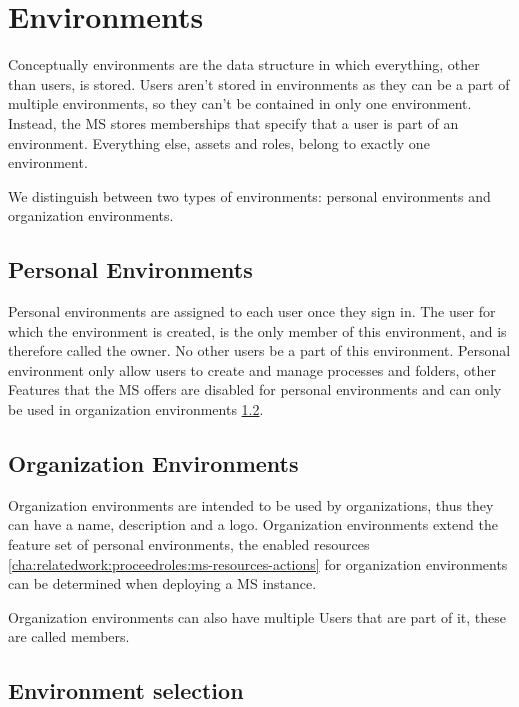 \section{Environments}
\label{cha:conceptanddesign:environments}

Conceptually environments are the data structure in which everything, other than users, is
stored.
Users aren't stored in environments as they can be a part of multiple environments, 
so they can't be contained in only one environment.
Instead, the MS stores memberships that specify that a user is part of an environment.
Everything else, assets and roles, belong to exactly one environment.

We distinguish between two types of environments: personal environments and organization
environments.

\subsection{Personal Environments}
\label{cha:conceptanddesign:environments:personal}

Personal environments are assigned to each user once they sign in. 
The user for which the environment is created, is the only member of this
environment, and is therefore called the owner.
No other users be a part of this environment.
Personal environment only allow users to create and manage processes and folders,
other Features that the MS offers are disabled for personal environments and can only be
used in organization environments \ref{cha:conceptanddesign:environments:organization}.

\subsection{Organization Environments}
\label{cha:conceptanddesign:environments:organization}

Organization environments are intended to be used by organizations, thus they can have a
name, description and a logo.
Organization environments extend the feature set of personal environments, the enabled
resources \ref{cha:relatedwork:proceedroles:ms-resources-actions} for organization
environments can be determined when deploying a MS instance.

Organization environments can also have multiple Users that are part of it, these are
called members.


\subsection{Environment selection}

